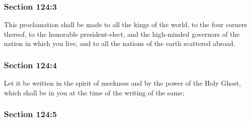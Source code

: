 
	\subsubsection{Section 124:3} %
		\label{DC124-3}

		This proclamation shall be made to all the kings of the world, to the four corners thereof, to the honorable president-elect, and the high-minded governors of the nation in which you live, and to all the nations of the earth scattered abroad.


	\subsubsection{Section 124:4} %
		\label{DC124-4}

		Let it be written in the spirit of meekness and by the power of the Holy Ghost, which shall be in you at the time of the writing of the same;


	\subsubsection{Section 124:5} %
		\label{DC124-5}

